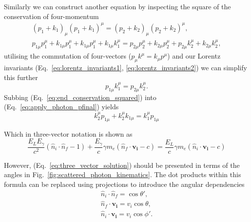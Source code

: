 \documentclass[../main.tex]{subfiles}
\begin{document}
Similarly we can construct another equation by inspecting the square of the conservation of four-momentum
\begin{gather}
\left(p_{1}+k_{1}\right)_{\mu}\left(p_{1}+k_{1}\right)^{\mu} = \left(p_{2}+k_{2}\right)_{\mu}\left(p_{2}+k_{2}\right)^{\mu}, \\
p_{1\mu}p_{1}^{\mu}+k_{1\mu}p_{1}^{\mu}+k_{1\mu}p_{1}^{\mu}+k_{1\mu}k_{1}^{\mu} = p_{2\mu}p_{2}^{\mu}+k_{2\mu}p_{2}^{\mu}+p_{2\mu}k_{2}^{\mu}+k_{2\mu}k_{2}^{\mu},
\label{eq:apply_conservation_squared}
\end{gather}
utilising the commutation of four-vectors ($p_{\mu}k^{\mu} = k_{\mu}p^{\mu}$) and our Lorentz invariants (Eq.~\ref{eq:lorentz_invariants1}, \ref{eq:lorentz_invariants2}) we can simplify this further 
\begin{equation}
p_{1\mu}k_{1}^{\mu} = p_{2\mu}k_{2}^{\mu}.
\label{eq:end_conservation_squared}
\end{equation}
Subbing (Eq.~\ref{eq:end_conservation_squared}) into (Eq.~\ref{eq:apply_photon_pfinal}) yields
\begin{equation}
k_{2}^{\mu}p_{1\mu}+k_{2}^{\mu}k_{1\mu} = k_{1}^{\mu}p_{1\mu}
\label{eq:substitution_four_vector}
\end{equation}

Which in three-vector notation is shown as
\begin{equation}
\frac{E_{L}E_{\gamma}}{c^{2}}\left(\hat{n}_{i}\cdot\hat{n}_{f}-1\right)+\frac{E_{\gamma}}{c}\gamma m_{e}\left(\hat{n}_{f}\cdot \boldsymbol{v_{i}}-c\right) = \frac{E_{L}}{c}\gamma m_{e}\left(\hat{n}_{i}\cdot \boldsymbol{v_{i}} -c\right)
\label{eq:three_vector_solution}
\end{equation}

However, (Eq.~\ref{eq:three_vector_solution}) should be presented in terms of the angles in Fig.~\ref{fig:scattered_photon_kinematics}. The dot products within this formula can be replaced using projections to introduce the angular dependencies
\begin{gather}
\hat{n}_{i}\cdot\hat{n}_{f} = \cos\theta',
\label{eq:projection_angle_incident_scattered_photon}\\
\hat{n}_{f}\cdot \boldsymbol{v_{i}} = v_{i}\cos\theta,
\label{eq:projection_scattering_angle}\\
\hat{n}_{i}\cdot \boldsymbol{v_{i}} = v_{i}\cos\phi'.
\label{eq:projection_pi_minus_crossing_angle}
\end{gather}
\end{document}
